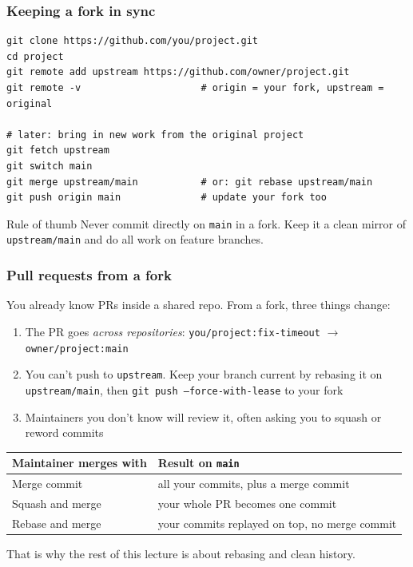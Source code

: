 \documentclass[aspectratio=169,10pt,compress]{beamer}
\newcommand{\cmd}[1]{\texttt{\color{gitred}#1}}
\begin{document}
\begin{frame}[t,fragile] \frametitle{Keeping a fork in sync}
\begin{lstlisting}
git clone https://github.com/you/project.git
cd project
git remote add upstream https://github.com/owner/project.git
git remote -v                     # origin = your fork, upstream = original

# later: bring in new work from the original project
git fetch upstream
git switch main
git merge upstream/main           # or: git rebase upstream/main
git push origin main              # update your fork too
\end{lstlisting}

  \begin{block}{Rule of thumb}
    Never commit directly on \texttt{main} in a fork. Keep it a clean mirror of
    \texttt{upstream/main} and do all work on feature branches.
  \end{block}
\end{frame}

\begin{frame}[t,fragile] \frametitle{Pull requests from a fork}
  You already know PRs inside a shared repo. From a fork, three things change:
  \begin{enumerate}
    \item The PR goes \emph{across repositories}:
          \texttt{you/project:fix-timeout} $\rightarrow$ \texttt{owner/project:main}
    \item You can't push to \texttt{upstream}. Keep your branch current by rebasing it on
          \texttt{upstream/main}, then \cmd{git push --force-with-lease} to your fork
    \item Maintainers you don't know will review it, often asking you to squash or reword commits
  \end{enumerate}

  \vspace{0.3em}
  \small
  \begin{tabular}{@{}L{0.26\textwidth}L{0.66\textwidth}@{}}
    \toprule
    \textbf{Maintainer merges with} & \textbf{Result on \texttt{main}} \\
    \midrule
    Merge commit & all your commits, plus a merge commit \\
    Squash and merge & your whole PR becomes one commit \\
    Rebase and merge & your commits replayed on top, no merge commit \\
    \bottomrule
  \end{tabular}

  \normalsize
  \vspace{0.3em}
  That is why the rest of this lecture is about rebasing and clean history.
\end{frame}
\end{document}
